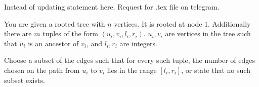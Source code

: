 Instead of updating statement here. Request for .tex file on telegram.

You are given a rooted tree with $n$ vertices. It is rooted at node $1$. Additionally there are $m$ tuples of the form $(u_i ,v_i ,l_i ,r_i)$. $u_i,v_i$ are vertices in the tree such that $u_i$ is an ancestor of $v_i$, and $l_i,r_i$ are integers.

Choose a subset of the edges such that for every such tuple, the number of edges chosen on the path from $u_i$ to $v_i$ lies in the range $[l_i,r_i]$, or state that no such subset exists.
